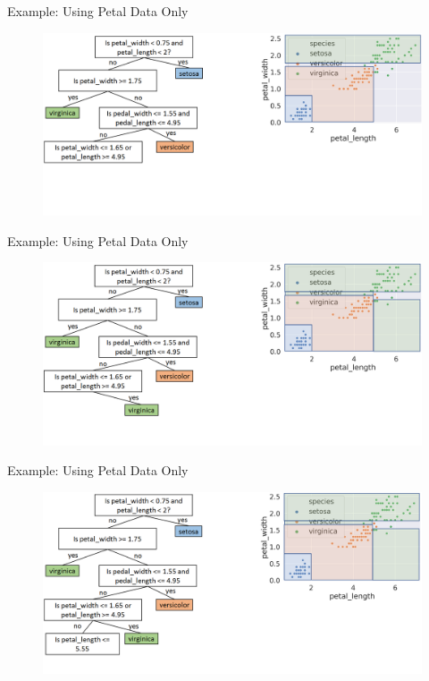 \documentclass[aspectratio=169]{../latex_main/tntbeamer}  %
\begin{document}
	
	\begin{frame}{Example: Using Petal Data Only}
	    \begin{figure}
	        \includegraphics[scale=.34]{Bild12}
	    \end{figure}
	\end{frame}
	
	
	\begin{frame}{Example: Using Petal Data Only}
	    \begin{figure}
	        \includegraphics[scale=.34]{Bild13}
	    \end{figure}
	\end{frame}
	
	
	\begin{frame}{Example: Using Petal Data Only}
	    \begin{figure}
	        \includegraphics[scale=.34]{Bild14}
	    \end{figure}
	\end{frame}
	
\end{document}

